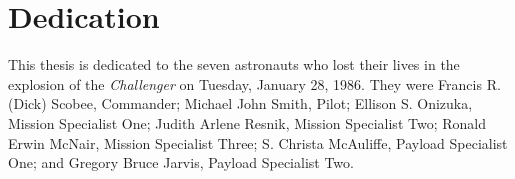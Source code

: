 \chapter*{Dedication}

This thesis is dedicated to the seven astronauts who lost their lives in the explosion of the {\em Challenger} on Tuesday, January 28, 1986. They were Francis R. (Dick) Scobee, Commander; Michael John Smith, Pilot; Ellison S. Onizuka, Mission Specialist One; Judith Arlene Resnik, Mission Specialist Two; Ronald Erwin McNair, Mission Specialist Three; S. Christa McAuliffe, Payload Specialist One; and Gregory Bruce Jarvis, Payload Specialist Two.
